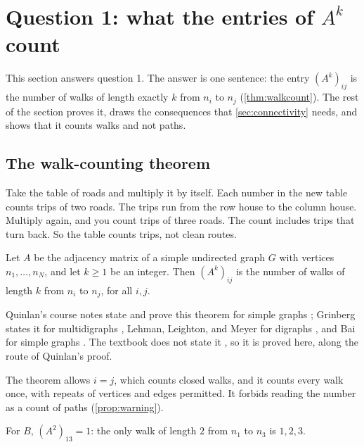 \section{Question 1: what the entries of $A^k$ count}\label{sec:walks}

This section answers question 1.
The answer is one sentence: the entry $(A^k)_{ij}$ is the number of walks of length exactly $k$ from $n_i$ to $n_j$ (\cref{thm:walkcount}).
The rest of the section proves it, draws the consequences that \cref{sec:connectivity} needs, and shows that it counts walks and not paths.

\subsection{The walk-counting theorem}\label{sec:walkcounting}

\plainwords Take the table of roads and multiply it by itself.
Each number in the new table counts trips of two roads.
The trips run from the row house to the column house.
Multiply again, and you count trips of three roads.
The count includes trips that turn back.
So the table counts trips, not clean routes.

\begin{theorem}\label{thm:walkcount}
Let $A$ be the adjacency matrix of a simple undirected graph $G$ with vertices $n_1,\dots,n_N$, and let $k\ge 1$ be an integer.
Then $(A^k)_{ij}$ is the number of walks of length $k$ from $n_i$ to $n_j$, for all $i,j$.
\end{theorem}

Quinlan's course notes state and prove this theorem for simple graphs \cite[Theorem~1.1.3]{quinlan_matrices_graphs}; Grinberg states it for multidigraphs \cite[Theorem~4.5.10]{grinberg2025graph}, Lehman, Leighton, and Meyer for digraphs \cite[Corollary~9.3.3]{lehman_mcs_adjacency}, and Bai for simple graphs \cite[Theorem~1]{bai2025adjacency}.
The textbook does not state it \cite{petrosyan2015grafneri}, so it is proved here, along the route of Quinlan's proof.

\begin{remark}\label{rem:walkcount}
The theorem allows $i=j$, which counts closed walks, and it counts every walk once, with repeats of vertices and edges permitted.
It forbids reading the number as a count of paths (\cref{prop:warning}).
\end{remark}

\begin{example}
For $B$, $(A^2)_{13}=1$: the only walk of length $2$ from $n_1$ to $n_3$ is $1,2,3$.
\end{example}

